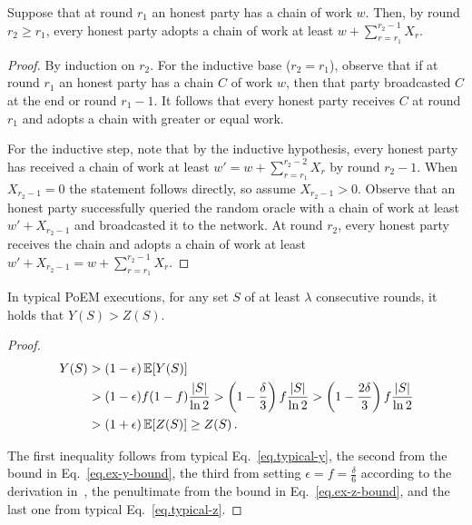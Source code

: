\begin{lemma}
  Suppose that at round $r_1$ an honest party has a chain of work $w$.
  Then, by round $r_2 \geq r_1$, every honest party adopts a chain of work at least
  $w + \sum_{r = r_1}^{r_2 - 1}{X_r}$.
\end{lemma}
\begin{proof}
  By induction on $r_2$. For the inductive base ($r_2 = r_1$), observe that
  if at round $r_1$ an honest party has a chain $C$ of work $w$, then
  that party broadcasted $C$ at the end or round $r_1 - 1$. It follows that
  every honest party receives $C$ at round $r_1$ and adopts a chain with
  greater or equal work.

  For the inductive step, note that by the inductive hypothesis,
  every honest party has received a chain of work at least $w' = w + \sum_{r = r_1}^{r_2 - 2}{X_r}$
  by round $r_2 - 1$. When $X_{r_2 - 1} = 0$ the statement follows directly, so assume
  $X_{r_2 - 1} > 0$. Observe that an honest party successfully queried the random oracle
  with a chain of work at least $w' + X_{r_2 - 1}$ and broadcasted it to the network.
  At round $r_2$, every honest party receives the chain and adopts a chain
  of work at least $w' + X_{r_2 - 1} = w + \sum_{r = r_1}^{r_2 - 1}{X_r}$. \Qed
\end{proof}

\begin{lemma} \label{lem:typical-bounds}
  In typical PoEM executions, for any set $S$ of at least $\lambda$ consecutive rounds,
  it holds that $Y(S) > Z(S)$.
\end{lemma}
\begin{proof}
  \begin{align*}
    Y(S) &> (1 - \epsilon)\mathop{{}\mathbb{E}}[Y(S)]\\
         &> (1 - \epsilon) f (1 - f) \frac{|S|}{\ln2}
          > \left(1 - \frac{\delta}{3}\right) f \frac{|S|}{\ln2}
          > \left(1 - \frac{2\delta}{3}\right) f \frac{|S|}{\ln2}\\
         &> (1 + \epsilon)\mathop{{}\mathbb{E}}[Z(S)] \geq Z(S)\,.
  \end{align*}

  The first inequality follows from typical Eq.~\ref{eq.typical-y},
  the second from the bound in Eq.~\ref{eq.ex-y-bound},
  the third from setting $\epsilon = f = \frac{\delta}{6}$
  according to the derivation in~\cite[Chapter 13]{blockchain-foundations},
  the penultimate from the bound in Eq.~\ref{eq.ex-z-bound},
  and the last one from typical Eq.~\ref{eq.typical-z}.
  \Qed
\end{proof}


